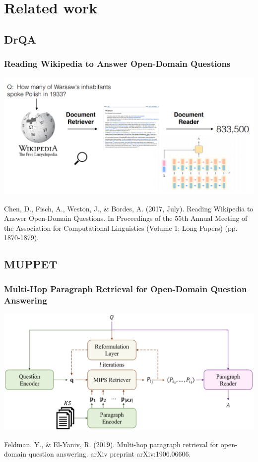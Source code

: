 \documentclass[]{beamer}
\begin{document}
\section{Related work}

\subsection{DrQA}
\begin{frame}
\frametitle{Reading Wikipedia to Answer Open-Domain Questions}


\centering
\includegraphics[scale=0.24]{2.png}

\centering
\tiny{{ \color{gray}Chen, D., Fisch, A., Weston, J., \& Bordes, A. (2017, July). Reading Wikipedia to Answer Open-Domain Questions. In Proceedings of the 55th Annual Meeting of the Association for Computational Linguistics (Volume 1: Long Papers) (pp. 1870-1879).}}

\end{frame}

\subsection{MUPPET}
\begin{frame}
\frametitle{Multi-Hop Paragraph Retrieval for Open-Domain Question Answering}

\centering
\includegraphics[scale=0.21]{3.png}


\centering
\tiny{ {\color{gray}Feldman, Y., \& El-Yaniv, R. (2019). Multi-hop paragraph retrieval for open-domain question answering. arXiv preprint arXiv:1906.06606.}}

\end{frame}
\end{document}
